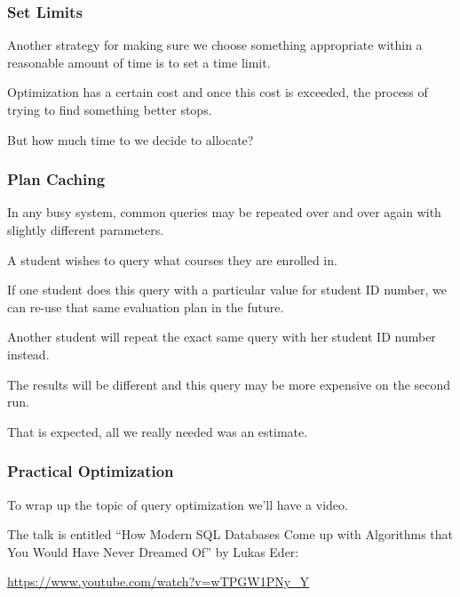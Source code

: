 \begin{frame}
\frametitle{Set Limits}

Another strategy for making sure we choose something appropriate within a reasonable amount of time is to set a time limit. 

Optimization has a certain cost and once this cost is exceeded, the process of trying to find something better stops. 

But how much time to we decide to allocate? 


\end{frame}

\begin{frame}
\frametitle{Plan Caching}

In any busy system, common queries may be repeated over and over again with slightly different parameters. 

A student wishes to query what courses they are enrolled in. 

If one student does this query with a particular value for student ID number, we can re-use that same evaluation plan in the future.

Another student will repeat the exact same query with her student ID number instead.

The results will be different and this query may be more expensive on the second run.

That is expected, all we really needed was an estimate.

\end{frame}

\begin{frame}
\frametitle{Practical Optimization}

To wrap up the topic of query optimization we'll have a video. 

The talk is entitled ``How Modern SQL Databases Come up with Algorithms that You Would Have Never Dreamed Of'' by Lukas Eder: 

\begin{center}
\url{https://www.youtube.com/watch?v=wTPGW1PNy_Y}
\end{center}


\end{frame}




